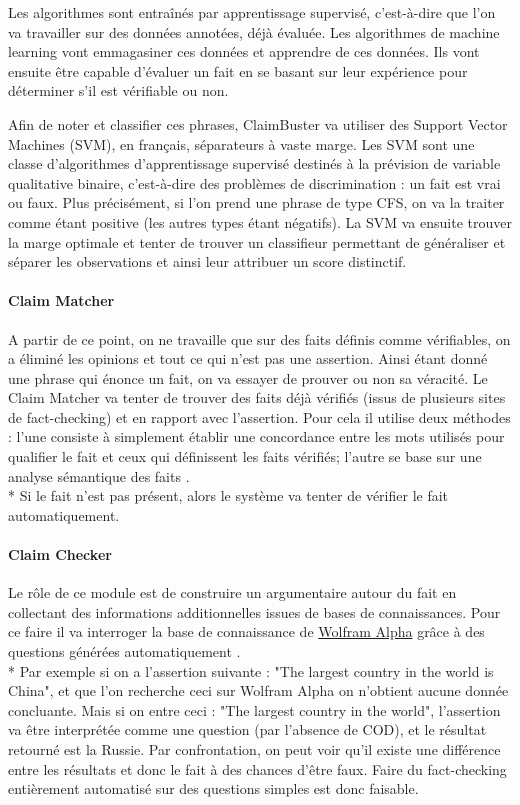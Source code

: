 Les algorithmes sont entraînés par apprentissage supervisé, c'est-à-dire que l'on va travailler sur des données annotées, déjà évaluée. Les algorithmes de machine learning vont emmagasiner ces données et apprendre de ces données. Ils vont ensuite être capable d'évaluer un fait en se basant sur leur expérience pour déterminer s'il est vérifiable ou non.

Afin de noter et classifier ces phrases, ClaimBuster va utiliser des Support Vector Machines (SVM), en français, séparateurs à vaste marge. Les SVM sont une classe d'algorithmes d'apprentissage supervisé destinés à la prévision de variable qualitative binaire, c'est-à-dire des problèmes de discrimination : un fait est vrai ou faux. Plus précisément, si l'on prend une phrase de type CFS, on va la traiter comme étant positive (les autres types étant négatifs). La SVM va ensuite trouver la marge optimale et tenter de trouver un classifieur permettant de généraliser et séparer les observations et ainsi leur attribuer un score distinctif.

\paragraph{Claim Matcher}

A partir de ce point, on ne travaille que sur des faits définis comme vérifiables, on a éliminé les opinions et tout ce qui n'est pas une assertion. Ainsi étant donné une phrase qui énonce un fait, on va essayer de prouver ou non sa véracité. Le Claim Matcher va tenter de trouver des faits déjà vérifiés (issus de plusieurs sites de fact-checking) et en rapport avec l'assertion. Pour cela il utilise deux méthodes : l'une consiste à simplement établir une concordance entre les mots utilisés pour qualifier le fait et ceux qui définissent les faits vérifiés; l'autre se base sur une analyse sémantique des faits \cite{rus2013semilar}. 
\\*
Si le fait n'est pas présent, alors le système va tenter de vérifier le fait automatiquement.

\paragraph{Claim Checker}

Le rôle de ce module est de construire un argumentaire autour du fait en collectant des informations additionnelles issues de bases de connaissances. Pour ce faire il va interroger la base de connaissance de \href{https://www.wolframalpha.com/about.html}{Wolfram Alpha} grâce à des questions générées automatiquement \cite{heilman2009question}. 
\\*
Par exemple si on a l'assertion suivante : "The largest country in the world is China", et que l'on recherche ceci sur Wolfram Alpha on n'obtient aucune donnée concluante. Mais si on entre ceci : "The largest country in the world", l'assertion va être interprétée comme une question (par l'absence de COD), et le résultat retourné est la Russie. Par confrontation, on peut voir qu'il existe une différence entre les résultats et donc le fait à des chances d'être faux. Faire du fact-checking entièrement automatisé sur des questions simples est donc faisable.

